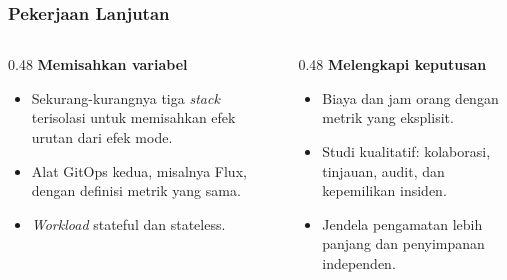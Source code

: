 {
\usebackgroundtemplate{\backgroundcontent}
\begin{frame}
    \frametitle{Pekerjaan Lanjutan}
    \begin{columns}[T]
        \begin{column}{0.48\textwidth}
            \scriptsize
            \textbf{Memisahkan variabel}
            \begin{itemize}\setlength{\itemsep}{3pt}
                \item Sekurang-kurangnya tiga \textit{stack} terisolasi untuk memisahkan efek urutan dari efek mode.
                \item Alat GitOps kedua, misalnya Flux, dengan definisi metrik yang sama.
                \item \textit{Workload} stateful dan stateless.
            \end{itemize}
        \end{column}
        \begin{column}{0.48\textwidth}
            \scriptsize
            \textbf{Melengkapi keputusan}
            \begin{itemize}\setlength{\itemsep}{3pt}
                \item Biaya dan jam orang dengan metrik yang eksplisit.
                \item Studi kualitatif: kolaborasi, tinjauan, audit, dan kepemilikan insiden.
                \item Jendela pengamatan lebih panjang dan penyimpanan independen.
            \end{itemize}
        \end{column}
    \end{columns}
    \vspace{0.12cm}
    \vspace{0.06cm}
\end{frame}
}

